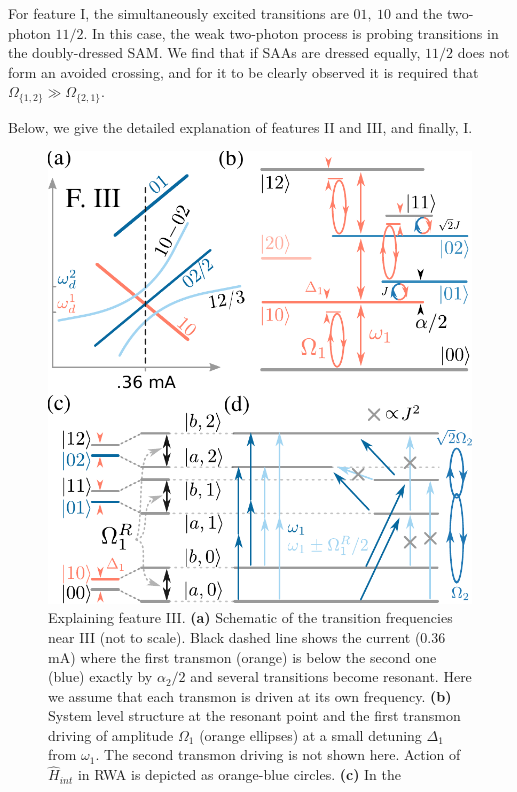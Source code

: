 \documentclass[%
 aps, prx,
 amsmath,amssymb,
 reprint,%
superscriptaddress
]{revtex4-2}
\begin{document}
For feature I, the simultaneously 
excited transitions are $01,\ 10$ and the 
two-photon $11/2$. In this case, the weak two-photon process is probing transitions in the doubly-dressed SAM. We find that if SAAs are dressed equally, $11/2$ does not form an avoided crossing, and for it to be clearly observed it is required that 
$\Omega_{\{1,2\}} \gg \Omega_{\{2,1\}}$. 

Below, we give the detailed explanation of features II and III, and finally, I.

\begin{figure}
	\centering
	\includegraphics[width=\linewidth]{main_scheme_2}  
	\caption{Explaining feature III. \textbf{(a)} 
	Schematic of the transition frequencies near 
	III (not to scale). Black dashed line shows the 
	current (0.36 mA) where the first transmon 
	(orange) is below the second one (blue) 
	exactly by $\alpha_2/2$ and several 
	transitions become resonant. Here we assume 
	that each transmon is driven at its own 
	frequency. \textbf{(b)} System level 
	structure at the resonant point and the first transmon 
	driving of amplitude $\Omega_1$ 
	(orange ellipses) at a small detuning 
	$\Delta_1$ from $\omega_1$. The second 
	transmon driving is not shown here. Action of 
	$\hat H_{int}$ in RWA is depicted as 
	orange-blue circles. \textbf{(c)} In the 
}
\end{figure}
\end{document}
